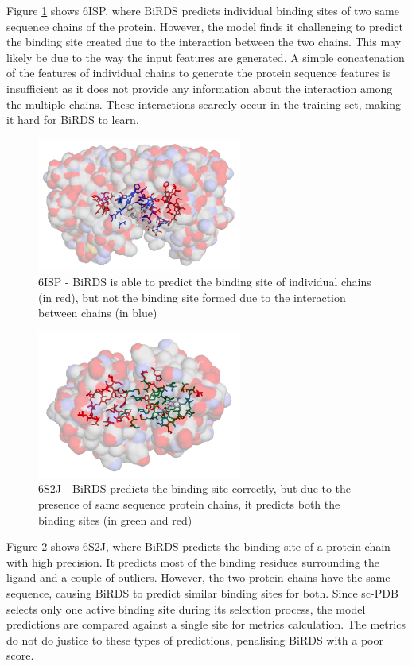 \documentclass[journal=jcisd8,manuscript=article]{achemso}
\begin{document}
Figure \ref{fig:6isp} shows 6ISP\cite{cen2019artificial}, where BiRDS predicts individual binding sites of two same sequence chains of the protein. However, the model finds it challenging to predict the binding site created due to the interaction between the two chains. This may likely be due to the way the input features are generated. A simple concatenation of the features of individual chains to generate the protein sequence features is insufficient as it does not provide any information about the interaction among the multiple chains. These interactions scarcely occur in the training set, making it hard for BiRDS to learn.
\begin{figure}
    \centering
    \noindent\includegraphics[width=0.6\textwidth]{6isp.png}
    \caption{\centering 6ISP - BiRDS is able to predict the binding site of individual chains (in red), but not the binding site formed due to the interaction between chains (in blue)}
    \label{fig:6isp}
\end{figure}

\begin{figure}
    \centering
    \noindent\includegraphics[width=0.6\textwidth]{6s2j.png}
    \caption{\centering 6S2J - BiRDS predicts the binding site correctly, but due to the presence of same sequence protein chains, it predicts both the binding sites (in green and red)}
    \label{fig:6s2j}
\end{figure}

Figure \ref{fig:6s2j} shows 6S2J\cite{teixeira2019activation}, where BiRDS predicts the binding site of a protein chain with high precision. It predicts most of the binding residues surrounding the ligand and a couple of outliers. However, the two protein chains have the same sequence, causing BiRDS to predict similar binding sites for both. Since sc-PDB selects only one active binding site during its selection process, the model predictions are compared against a single site for metrics calculation. The metrics do not do justice to these types of predictions, penalising BiRDS with a poor score.
\end{document}
